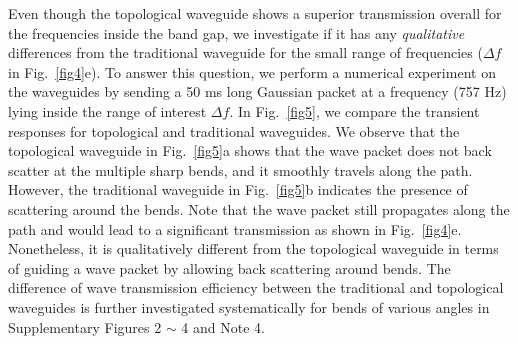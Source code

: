\documentclass[aps,preprint,onecolumn,showpacs,superscriptaddress,groupedaddress]{revtex4}  %
\begin{document}
Even though the topological waveguide shows a superior transmission overall for the frequencies inside the band gap, we investigate if it has any \textit{qualitative} differences from the traditional waveguide for the small range of frequencies ($\Delta f$ in Fig.~\ref{fig4}e). To answer this question, we perform a numerical experiment on the waveguides by sending a 50 ms long Gaussian packet at a frequency (757 Hz) lying inside the range of interest $\Delta f$. In Fig.~\ref{fig5}, we compare the transient responses for topological and traditional waveguides. We observe that the topological waveguide in Fig.~\ref{fig5}a shows that the wave packet does not back scatter at the multiple sharp bends, and it smoothly travels along the path. However, the traditional waveguide in Fig.~\ref{fig5}b indicates the presence of scattering around the bends. Note that the wave packet still propagates along the path and would lead to a significant transmission as shown in Fig.~\ref{fig4}e. Nonetheless, it is qualitatively different from the topological waveguide in terms of guiding a wave packet by allowing back scattering around bends. The difference of wave transmission efficiency between the traditional and topological waveguides is further investigated systematically for bends of various angles in Supplementary Figures 2 $\sim$ 4 and Note 4. 
 
\vspace{3ex}
\end{document}
